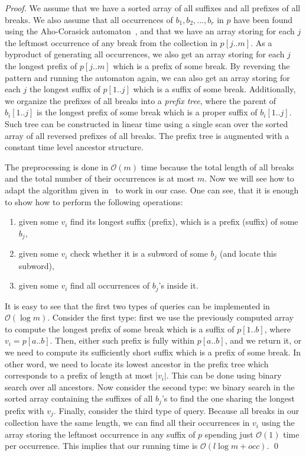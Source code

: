 \documentclass[runningheads]{llncs}
\begin{document}
\begin{proof}
We assume that we have a sorted array of all suffixes and all prefixes of all breaks. We also assume that all occurrences of $b_1,b_2,...,b_r$ in $p$ have been found using the Aho-Corasick automaton~\cite{AhoCorasick}, and that we have an array storing for each $j$ the leftmost occurrence of any break from the collection in $p[j..m]$.
As a byproduct of generating all occurrences, we also get an array storing for each $j$ the longest prefix of $p[j..m]$ which is a prefix of some break.
By reversing the pattern and running the automaton again, we can also get an array storing for each $j$ the longest suffix of $p[1..j]$ which is a suffix of some break. Additionally, we organize the prefixes of all breaks into a {\it prefix tree}, where the parent of $b_{i}[1..j]$ is the longest prefix of some break which is a proper suffix of $b_{i}[1..j]$. Such tree can be constructed in linear time using a single scan over the sorted array of all reversed prefixes of all breaks. The prefix tree is augmented with a constant time level ancestor structure.

The preprocessing is done in $\mathcal{O}(m)$ time because the total length of all breaks and the total number of their occurrences is at most $m$.
Now we will see how to adapt the algorithm given in~\cite{GawrychowskiMultipleLZW} to work in our case. One can see, that it is enough to show how to perform the following operations:
\begin{enumerate}
\item given some $v_i$ find its longest suffix (prefix), which is a prefix (suffix) of some $b_j$,
\item given some $v_i$ check whether it is a subword of some $b_j$ (and locate this subword),
\item given some $v_i$ find all occurrences of $b_j$'s inside it.
\end{enumerate}
It is easy to see that the first two types of queries can be implemented in $\mathcal{O}(\log m)$. Consider the first type: first we use the previously computed array to compute the longest prefix of some break which is a suffix of $p[1..b]$, where $v_{i}=p[a..b]$. Then, either such prefix is
fully within $p[a..b]$, and we return it, or we need to compute its sufficiently short suffix which is a prefix of some break. In other word, we need
to locate its lowest ancestor in the prefix tree which corresponds to a prefix of length at most $|v_{i}|$. This can be done using binary search over all ancestors. Now consider
the second type: we binary search in the sorted array containing the suffixes of all $b_{j}$'s to find the one sharing the longest prefix with $v_{j}$. Finally, consider the third type of query. Because all breaks in our collection have the same length, we can find all their occurrences in $v_i$ using the array storing the leftmost occurrence in any
suffix of $p$ spending just $\mathcal{O}(1)$ time per occurrence. This implies that our running time is $\mathcal{O}(l \log m + occ)$.
\qed
\end{proof}
\end{document}
